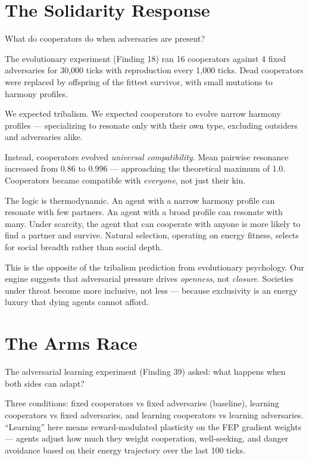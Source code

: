 \section{The Solidarity Response}\label{the-solidarity-response}

What do cooperators do when adversaries are present?

The evolutionary experiment (Finding 18) ran 16 cooperators against 4 fixed adversaries for 30,000 ticks with reproduction every 1,000 ticks. Dead cooperators were replaced by offspring of the fittest survivor, with small mutations to harmony profiles.

We expected tribalism. We expected cooperators to evolve narrow harmony profiles --- specializing to resonate only with their own type, excluding outsiders and adversaries alike.

Instead, cooperators evolved \emph{universal compatibility}. Mean pairwise resonance increased from 0.86 to 0.996 --- approaching the theoretical maximum of 1.0. Cooperators became compatible with \emph{everyone}, not just their kin.

The logic is thermodynamic. An agent with a narrow harmony profile can resonate with few partners. An agent with a broad profile can resonate with many. Under scarcity, the agent that can cooperate with anyone is more likely to find a partner and survive. Natural selection, operating on energy fitness, selects for social breadth rather than social depth.

This is the opposite of the tribalism prediction from evolutionary psychology. Our engine suggests that adversarial pressure drives \emph{openness}, not \emph{closure}. Societies under threat become more inclusive, not less --- because exclusivity is an energy luxury that dying agents cannot afford.

\section{The Arms Race}\label{the-arms-race}

The adversarial learning experiment (Finding 39) asked: what happens when both sides can adapt?

Three conditions: fixed cooperators vs fixed adversaries (baseline), learning cooperators vs fixed adversaries, and learning cooperators vs learning adversaries. ``Learning'' here means reward-modulated plasticity on the FEP gradient weights --- agents adjust how much they weight cooperation, well-seeking, and danger avoidance based on their energy trajectory over the last 100 ticks.

